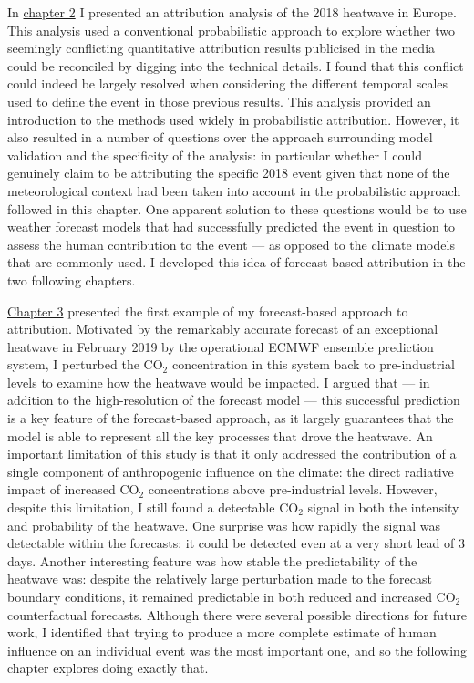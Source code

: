   In \hyperref[ch2]{chapter 2} I presented an attribution analysis of the 2018 heatwave in Europe. This analysis used a conventional probabilistic approach to explore whether two seemingly conflicting quantitative attribution results publicised in the media could be reconciled by digging into the technical details. I found that this conflict could indeed be largely resolved when considering the different temporal scales used to define the event in those previous results. This analysis provided an introduction to the methods used widely in probabilistic attribution. However, it also resulted in a number of questions over the approach surrounding model validation and the specificity of the analysis: in particular whether I could genuinely claim to be attributing the specific 2018 event given that none of the meteorological context had been taken into account in the probabilistic approach followed in this chapter. One apparent solution to these questions would be to use weather forecast models that had successfully predicted the event in question to assess the human contribution to the event --- as opposed to the climate models that are commonly used. I developed this idea of forecast-based attribution in the two following chapters.

  \hyperref[ch3]{Chapter 3} presented the first example of my forecast-based approach to attribution. Motivated by the remarkably accurate forecast of an exceptional heatwave in February 2019 by the operational ECMWF ensemble prediction system, I perturbed the CO$_2$ concentration in this system back to pre-industrial levels to examine how the heatwave would be impacted. I argued that --- in addition to the high-resolution of the forecast model --- this successful prediction is a key feature of the forecast-based approach, as it largely guarantees that the model is able to represent all the key processes that drove the heatwave. An important limitation of this study is that it only addressed the contribution of a single component of anthropogenic influence on the climate: the direct radiative impact of increased CO$_2$ concentrations above pre-industrial levels. However, despite this limitation, I still found a detectable CO$_2$ signal in both the intensity and probability of the heatwave. One surprise was how rapidly the signal was detectable within the forecasts: it could be detected even at a very short lead of 3 days. Another interesting feature was how stable the predictability of the heatwave was: despite the relatively large perturbation made to the forecast boundary conditions, it remained predictable in both reduced and increased CO$_2$ counterfactual forecasts. Although there were several possible directions for future work, I identified that trying to produce a more complete estimate of human influence on an individual event was the most important one, and so the following chapter explores doing exactly that.

